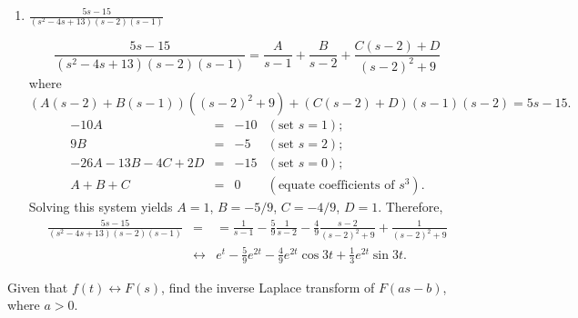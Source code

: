 \documentclass{ximera}
\begin{document}
\begin{problem}
\begin{enumerate}
\begin{solution}
$$
\frac{2s-3}{s(s-2)(s^2-2s+5)}
=\frac{A}{s}+\frac{B}{s-2}+\frac{C(s-1)+D}{(s-1)^2+4}
$$
where
$$
(A(s-2)+Bs)((s-1)^2+4)+(C(s-1)+D)s(s-2)=2s-3.
$$
$$
\begin{array}{rcrl}
-10A&=&-3&(\mbox{set }s=0);\\
10B&=&1& (\mbox{set }s=2);\\
-4A+4B-D&=&-1& (\mbox{set }s=1);\\
A+B+C&=&0&(\mbox{equate coefficients of }s^3).
\end{array}
$$
Solving this system yields $A=3/10$, $B=1/10$,
$C=-2/5$, $D=1/5$. Therefore,
\begin{eqnarray*}
\frac{2s-3}{s(s-2)(s^2-2s+5)}
&=&
=\frac{3}{10s}+\frac{1}{10}\frac{1}{s-2}-\frac{2}{5}\frac{s-1}{(s-1)^2+4}
+\frac{1}{5}\frac{1}{(s-1)^2+4}
\\&\leftrightarrow&
\frac{3}{10}+\frac{1}{10}e^{2t}-\frac{2}{5}e^t\cos 2t
+\frac{1}{10}e^t\sin2t.
\end{eqnarray*}
\end{solution}

\item $\frac{5s-15}{(s^2-4s+13)(s-2)(s-1)}$

\begin{solution}
$$
\frac{5s-15}{(s^2-4s+13)(s-2)(s-1)}
=\frac{A}{s-1}+\frac{B}{s-2}+\frac{C(s-2)+D}{(s-2)^2+9}
$$
where
$$
(A(s-2)+B(s-1))((s-2)^2+9)+(C(s-2)+D)(s-1)(s-2)=5s-15.
$$
$$
\begin{array}{rcrl}
-10A&=&-10&(\mbox{set }s=1);\\
9B&=&-5& (\mbox{set }s=2);\\
-26A-13B-4C+2D&=&-15& (\mbox{set }s=0);\\
A+B+C&=&0&(\mbox{equate coefficients of }s^3).
\end{array}
$$
Solving this system yields $A=1$, $B=-5/9$,
$C=-4/9$, $D=1$. Therefore,
\begin{eqnarray*}
\frac{5s-15}{(s^2-4s+13)(s-2)(s-1)}
&=&
=\frac{1}{s-1}-\frac{5}{9}\frac{1}{s-2}-\frac{4}{9}\frac{s-2}{(s-2)^2+9}
+\frac{1}{(s-2)^2+9}
\\&\leftrightarrow&
e^t-\frac{5}{9}e^{2t}-\frac{4}{9}e^{2t}\cos 3t+\frac{1}{3}e^{2t}\sin 3t.
\end{eqnarray*}
\end{solution}

\end{enumerate}
\end{problem}

\begin{problem}\label{exer:8.2.9}
 Given that $f(t)\leftrightarrow F(s)$, find the inverse
Laplace transform of $F(as-b)$, where $a>0$.
\end{problem}
\end{document}
